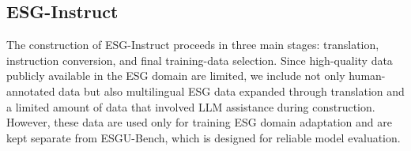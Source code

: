 \documentclass[11pt]{article}
\begin{document}
\subsection{\textsf{ESG-Instruct}}
\label{app:esg_instruct_details}
The construction of \textsf{ESG-Instruct} proceeds in three main stages: translation, instruction conversion, and final training-data selection. Since high-quality data publicly available in the ESG domain are limited, we include not only human-annotated data but also multilingual ESG data expanded through translation and a limited amount of data that involved LLM assistance during construction. However, these data are used only for training ESG domain adaptation and are kept separate from \textsf{ESGU-Bench}, which is designed for reliable model evaluation.
\begin{table}[t]
\centering
{}
\caption{Translation time for constructing \textsf{ESG-Instruct} from multilingual ESG datasets.}
\label{tab:translation_time}
\end{table}
\end{document}

